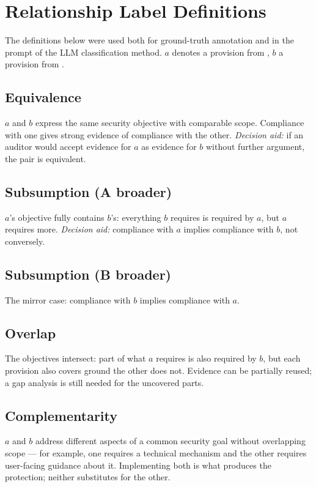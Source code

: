 \chapter{Relationship Label Definitions}\label{app:labels}

The definitions below were used both for ground-truth annotation and in the
prompt of the LLM classification method. $a$ denotes a provision from
\standardA{}, $b$ a provision from \standardB{}.

\section*{Equivalence}
$a$ and $b$ express the same security objective with comparable scope.
Compliance with one gives strong evidence of compliance with the other.
\emph{Decision aid:} if an auditor would accept evidence for $a$ as evidence
for $b$ without further argument, the pair is equivalent.

\section*{Subsumption (A broader)}
$a$'s objective fully contains $b$'s: everything $b$ requires is required by
$a$, but $a$ requires more. \emph{Decision aid:} compliance with $a$ implies
compliance with $b$, not conversely.

\section*{Subsumption (B broader)}
The mirror case: compliance with $b$ implies compliance with $a$.

\section*{Overlap}
The objectives intersect: part of what $a$ requires is also required by $b$,
but each provision also covers ground the other does not. Evidence can be
partially reused; a gap analysis is still needed for the uncovered parts.

\section*{Complementarity}
$a$ and $b$ address different aspects of a common security goal without
overlapping scope --- for example, one requires a technical mechanism and the
other requires user-facing guidance about it. Implementing both is what
produces the protection; neither substitutes for the other.

